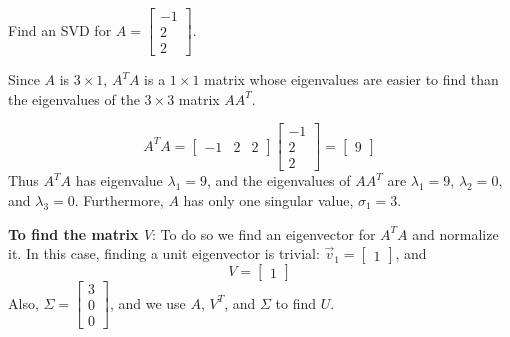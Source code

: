 \documentclass{ximera}
\begin{document}
\begin{example}\label{ex:SVD3x1}
Find an SVD for
$A=\left[\begin{array}{r} -1 \\ 2\\ 2 \end{array}\right]$.
 
\begin{explanation}
Since $A$ is $3\times 1$, $A^T A$ is a $1\times 1$ matrix
whose eigenvalues are easier to find than the eigenvalues of
the $3\times 3$ matrix $AA^T$.
 
\[ A^TA=\left[\begin{array}{ccc} -1 & 2 & 2 \end{array}\right]
\left[\begin{array}{r} -1 \\ 2 \\ 2 \end{array}\right]
=\left[\begin{array}{r} 9 \end{array}\right]\]
Thus $A^TA$ has eigenvalue $\lambda_1=9$, and
the eigenvalues of $AA^T$ are $\lambda_1=9$, $\lambda_2=0$, and
$\lambda_3=0$.
Furthermore, $A$ has only one singular value, $\sigma_1=3$.
 
\textbf{To find the matrix $V$}:
To do so we find an eigenvector for $A^TA$ and
normalize it.
In this case, finding a unit eigenvector is trivial:
$\vec{v}_1=\left[\begin{array}{r} 1 \end{array}\right]$, and
\[ V=\left[\begin{array}{r} 1 \end{array}\right]\]
Also,
$\Sigma =\left[\begin{array}{r} 3 \\ 0\\ 0 \end{array}\right]$,
and we use $A$, $V^T$, and $\Sigma$ to find $U$.
 

\end{explanation}
\end{example}
\end{document}
